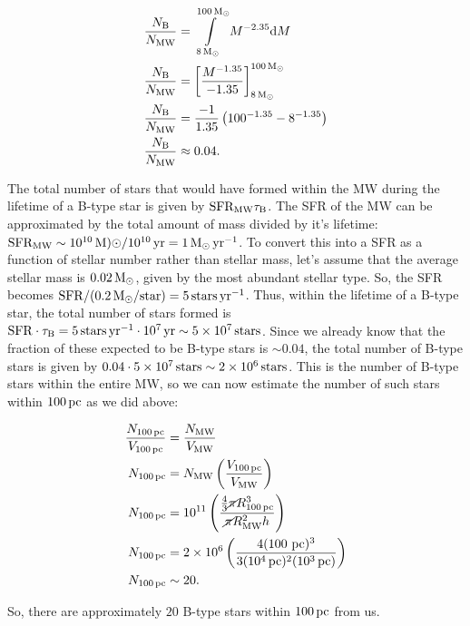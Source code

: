 \documentclass[a4paper,10pt]{article}
\begin{document}
\begin{align*}
    \frac{N_{\rm B}}{N_{\rm MW}} &= \int\limits_{8\,{\rm M_\odot}}^{100\,{\rm M_\odot}} M^{-2.35}{\rm d}M \\
    \frac{N_{\rm B}}{N_{\rm MW}} &= \left[\frac{M^{-1.35}}{-1.35}\right]_{8\,{\rm M_\odot}}^{100\,{\rm M_\odot}} \\
    \frac{N_{\rm B}}{N_{\rm MW}} &= \frac{-1}{1.35}\left(100^{-1.35} - 8^{-1.35}\right) \\
    \frac{N_{\rm B}}{N_{\rm MW}} &\approx 0.04.
\end{align*}

{\noindent}The total number of stars that would have formed within the MW during the lifetime of a B-type star is given by ${\rm SFR_{MW}} \tau_{\rm B}$. The SFR of the MW can be approximated by the total amount of mass divided by it's lifetime: ${\rm SFR_{MW}} \sim 10^{10}\,{\rm M)\odot}/10^{10}\,{\rm yr} = 1\,{\rm M_\odot\,yr^{-1}}$. To convert this into a SFR as a function of stellar number rather than stellar mass, let's assume that the average stellar mass is $0.02\,{\rm M_\odot}$, given by the most abundant stellar type. So, the SFR becomes ${\rm SFR}/(0.2\,{\rm M_\odot}/{\rm star}) = 5\,{\rm stars\,yr^{-1}}$. Thus, within the lifetime of a B-type star, the total number of stars formed is ${\rm SFR}\cdot \tau_{\rm B} = 5\,{\rm stars\,yr^{-1}}\cdot 10^7\,{\rm yr} \sim 5\times10^7\,{\rm stars}$. Since we already know that the fraction of these expected to be B-type stars is $\sim0.04$, the total number of B-type stars is given by $0.04\cdot5\times10^7\,{\rm stars}\sim2\times10^6\,{\rm stars}$. This is the number of B-type stars within the entire MW, so we can now estimate the number of such stars within $100\,{\rm pc}$ as we did above:

\begin{align*}
    \frac{N_{\rm 100\,pc}}{V_{\rm 100\,pc}} &= \frac{N_{\rm MW}}{V_{\rm MW}} \\
    N_{\rm 100\,pc} &= N_{\rm MW} \left(\frac{V_{\rm 100\,pc}}{V_{\rm MW}}\right) \\
    N_{\rm 100\,pc} &= 10^{11} \left(\frac{\frac{4}{3}\cancel{\pi} R_{\rm 100\,pc}^3}{\cancel{\pi} R_{\rm MW}^2h}\right) \\
    N_{\rm 100\,pc} &= 2\times10^{6} \left(\frac{4(100\,{\rm \,pc})^3}{3(10^4\,{\rm pc})^2(10^3\,{\rm pc})}\right) \\
    N_{\rm 100\,pc} &\sim 20.
\end{align*}

{\noindent}So, there are approximately $20$ B-type stars within $100\,{\rm pc}$ from us.
\end{document}
